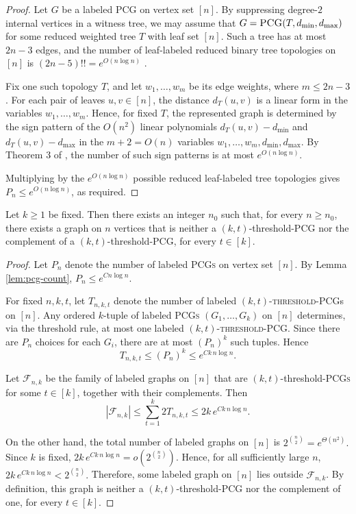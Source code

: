\documentclass[a4paper,UKenglish,cleveref,autoref,thm-restate]{socg-lipics-v2021}
\begin{document}
\begin{proof}
Let $G$ be a labeled \textsc{PCG} on vertex set $[n]$. By suppressing degree-$2$
internal vertices in a witness tree, we may assume that $G=\textsc{PCG}(T,d_{\min},d_{\max})$
for some reduced weighted tree $T$ with leaf set $[n]$. Such a tree has at most $2n-3$
edges, and the number of leaf-labeled reduced binary tree topologies on $[n]$ is
$(2n-5)!!=e^{O(n\log n)}$ \cite{Felsenstein1978,SempleSteel2003}.

Fix one such topology $T$, and let $w_1,\dots,w_m$ be its edge weights, where
$m\le 2n-3$. For each pair of leaves $u,v\in[n]$, the distance $d_T(u,v)$ is a linear
form in the variables $w_1,\dots,w_m$. Hence, for fixed $T$, the represented graph is
determined by the sign pattern of the $O(n^2)$ linear polynomials
$d_T(u,v)-d_{\min}$ and $d_T(u,v)-d_{\max}$ in the $m+2=O(n)$ variables
$w_1,\dots,w_m,d_{\min},d_{\max}$. By Theorem 3 of \cite{Warren1968}, the number of such sign
patterns is at most $e^{O(n\log n)}$.

Multiplying by the $e^{O(n\log n)}$ possible reduced leaf-labeled tree topologies gives
$P_n \le e^{O(n\log n)}$, as required.
\end{proof}
\begin{theorem}\label{thm:sparse-uniform-k}
Let $k \ge 1$ be fixed. Then there exists an integer $n_0$ such that, for every
$n \ge n_0$, there exists a graph on $n$ vertices that is neither a
$(k,t)$-threshold-\textsc{PCG} nor the complement of a
$(k,t)$-threshold-\textsc{PCG}, for every $t \in [k]$.
\end{theorem}

\begin{proof}
Let $P_n$ denote the number of labeled \textsc{PCGs} on vertex set $[n]$.
By Lemma \ref{lem:pcg-count},
\(
P_n \le e^{Cn\log n}.
\)

For fixed $n,k,t$, let $T_{n,k,t}$ denote the number of labeled
\textsc{$(k,t)$-threshold-\textsc{PCG}}s on $[n]$. Any ordered $k$-tuple of labeled
\textsc{PCGs} $(G_1,\dots,G_k)$ on $[n]$ determines, via the threshold rule, at most one
labeled \textsc{$(k,t)$-threshold-\textsc{PCG}}. Since there are $P_n$ choices for each
$G_i$, there are at most $(P_n)^k$ such tuples. Hence
\[
T_{n,k,t}\le (P_n)^k \le e^{Ck\,n\log n}.
\]

Let $\mathcal{F}_{n,k}$ be the family of labeled graphs on $[n]$ that are
$(k,t)$-threshold-\textsc{PCGs} for some $t\in[k]$, together with their complements.
Then
\[
|\mathcal{F}_{n,k}|
\le \sum_{t=1}^k 2T_{n,k,t}
\le 2k\,e^{Ck\,n\log n}.
\]

On the other hand, the total number of labeled graphs on $[n]$ is
\(
2^{\binom{n}{2}} = e^{\Theta(n^2)}.
\)
Since $k$ is fixed,
\(
2k\,e^{Ck\,n\log n}=o\!\left(2^{\binom{n}{2}}\right).
\)
Hence, for all sufficiently large $n$,
\(
2k\,e^{Ck\,n\log n}<2^{\binom{n}{2}}.
\)
Therefore, some labeled graph on $[n]$ lies outside $\mathcal{F}_{n,k}$.
By definition, this graph is neither a $(k,t)$-threshold-\textsc{PCG} nor the complement of one, for every $t\in[k]$.
\end{proof}
\end{document}
